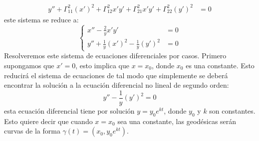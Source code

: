 \begin{example}
\begin{align*}
		y'' + \Gamma_{11}^{2} (x')^2 + \Gamma_{12}^{2} x'y' + \Gamma_{21}^{2}x'y' + \Gamma_{22}^{2}(y')^{2} & = 0
	\end{align*}
	este sistema se reduce a:
	\[
		\begin{cases}
			x'' - \frac{2}{y} x'y'                         & = 0 \\[12pt]
			y'' + \frac{1}{y} (x')^2 - \frac{1}{y}(y')^{2} & = 0
		\end{cases}
	\]
	Resolveremos este sistema de ecuaciones diferenciales por casos. Primero supongamos que $x' = 0$, esto implica que $x = x_{0}$, donde $x_0$ es una constante. Esto reducirá el sistema de ecuaciones de tal modo que simplemente se deberá encontrar la solución a la ecuación diferencial no lineal de segundo orden:
	\[
		y'' - \frac{1}{y}(y')^{2} = 0
	\]
	esta ecuación diferencial tiene por solución $y = y_0 e^{kt}$, donde $y_0$ y $k$ son constantes. Esto quiere decir que cuando $x = x_0$ sea una constante, las geodésicas serán curvas de la forma $\gamma(t) = (x_0, y_0 e^{kt})$.


\end{example}
